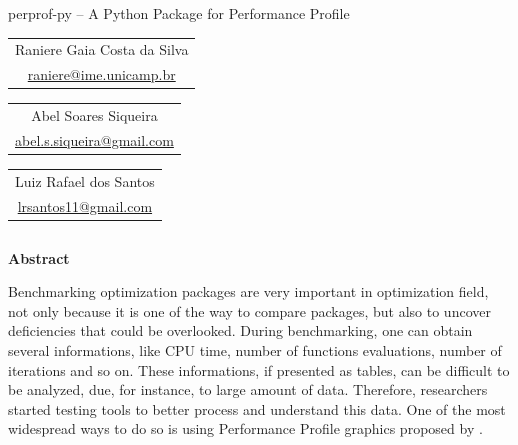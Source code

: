 \documentclass[]{beamer}
\begin{document}
\begin{frame}[t,fragile]
  \begin{center}
    \begin{huge}
      perprof-py -- A Python Package for Performance Profile 
    \end{huge}

    \vspace{40pt}
    \begin{Large}
      \begin{tabular}[]{c}
        Raniere Gaia Costa da Silva \\
        \url{raniere@ime.unicamp.br}
      \end{tabular} \hspace{5cm}
      \begin{tabular}[]{c}
        Abel Soares Siqueira \\
        \url{abel.s.siqueira@gmail.com}
      \end{tabular} \hspace{5cm}
      \begin{tabular}[]{c}
        Luiz Rafael dos Santos \\
        \url{lrsantos11@gmail.com}
      \end{tabular}
    \end{Large}
  \end{center}
  \vspace{40pt}

  \begin{columns}[t]
    \begin{column}{0.4\textwidth}
      \setlength{\parskip}{\baselineskip}
      \textbf{Abstract}

      Benchmarking optimization packages are very important in optimization
      field, not only because it is one of the way to compare packages, but also
      to uncover deficiencies that could be overlooked. During benchmarking, one
      can obtain several informations, like CPU time, number of functions
      evaluations, number of iterations and so on. These informations, if
      presented as tables, can be difficult to be analyzed, due, for instance,
      to large amount of data. Therefore, researchers started testing tools to
      better process and understand this data.  One of the most widespread ways
      to do so is using Performance Profile graphics proposed by
      \citeauthor{Dolan2001}.


\end{column}
\end{columns}
\end{frame}
\end{document}
